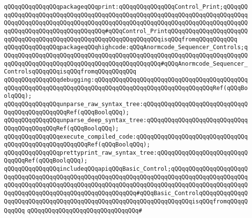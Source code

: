 \verb|qQQqqQQqqQQqqQQqpackageqQQqprint:qQQqqQQqqQQqqQQqControl_Print;qQQqqQQqqQQqqQQqqQQqqQQqqQQqqQQqqQQqqQQqqQQqqQQqqQQqqQQqqQQqqQQqqQQqqQQqqQQqqQQqqQQqqQQqqQQqqQQqqQQqqQQqqQQqqQQqqQQqqQQqqQQqqQQqqQQqqQQqqQQqqQQqqQQqqQQqqQQqqQQqqQQqqQQqqQQqqQQq#qQQqControl_PrintqQQqqQQqqQQqqQQqqQQqqQQqqQQqqQQqqQQqqQQqqQQqqQQqqQQqqQQqqQQqqQQqqQQqisqQQqfromqQQqqQQqqQQq|\newline
\verb|qQQqqQQqqQQqqQQqpackageqQQqhighcode:qQQqAnormcode_Sequencer_Controls;qQQqqQQqqQQqqQQqqQQqqQQqqQQqqQQqqQQqqQQqqQQqqQQqqQQqqQQqqQQqqQQqqQQqqQQqqQQqqQQqqQQqqQQqqQQqqQQqqQQqqQQqqQQqqQQqqQQq#qQQqAnormcode_Sequencer_ControlsqQQqqQQqisqQQqfromqQQqqQQqqQQq|\newline
\newline
\newline
\verb|qQQqqQQqqQQqqQQqdebugging:qQQqqQQqqQQqqQQqqQQqqQQqqQQqqQQqqQQqqQQqqQQqqQQqqQQqqQQqqQQqqQQqqQQqqQQqqQQqqQQqqQQqqQQqqQQqqQQqqQQqqQQqRef(qQQqBoolqQQq);|\newline
\verb|qQQqqQQqqQQqqQQqunparse_raw_syntax_tree:qQQqqQQqqQQqqQQqqQQqqQQqqQQqqQQqqQQqqQQqqQQqqQQqRef(qQQqBoolqQQq);|\newline
\verb|qQQqqQQqqQQqqQQqunparse_deep_syntax_tree:qQQqqQQqqQQqqQQqqQQqqQQqqQQqqQQqqQQqqQQqqQQqRef(qQQqBoolqQQq);|\newline
\verb|qQQqqQQqqQQqqQQqexecute_compiled_code:qQQqqQQqqQQqqQQqqQQqqQQqqQQqqQQqqQQqqQQqqQQqqQQqqQQqqQQqRef(qQQqBoolqQQq);|\newline
\verb|qQQqqQQqqQQqqQQqprettyprint_raw_syntax_tree:qQQqqQQqqQQqqQQqqQQqqQQqqQQqqQQqRef(qQQqBoolqQQq);|\newline
\newline
\newline
\verb|qQQqqQQqqQQqqQQqincludeqQQqapiqQQqBasic_Control;qQQqqQQqqQQqqQQqqQQqqQQqqQQqqQQqqQQqqQQqqQQqqQQqqQQqqQQqqQQqqQQqqQQqqQQqqQQqqQQqqQQqqQQqqQQqqQQqqQQqqQQqqQQqqQQqqQQqqQQqqQQqqQQqqQQqqQQqqQQqqQQqqQQqqQQqqQQqqQQqqQQqqQQqqQQqqQQqqQQqqQQqqQQqqQQqqQQqqQQq#qQQqBasic_ControlqQQqqQQqqQQqqQQqqQQqqQQqqQQqqQQqqQQqqQQqqQQqqQQqqQQqqQQqqQQqqQQqqQQqisqQQqfromqQQqqQQqqQQq|\newline
\verb|qQQqqQQqqQQqqQQqqQQqqQQqqQQqqQQq#|\newline

